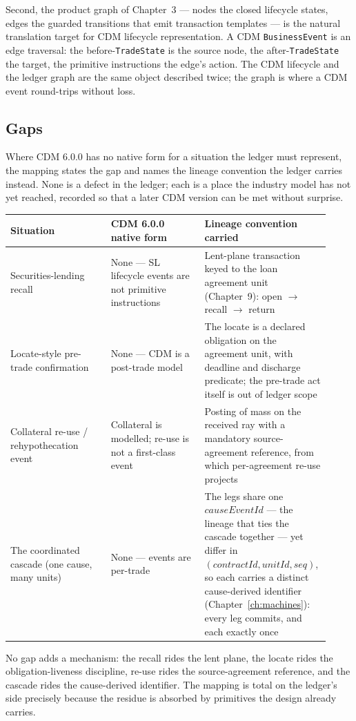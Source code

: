 Second, the product graph of Chapter~3 --- nodes the closed lifecycle states,
edges the guarded transitions that emit transaction templates --- is the natural
translation target for CDM lifecycle representation. A CDM \texttt{BusinessEvent}
is an edge traversal: the before-\texttt{TradeState} is the source node, the
after-\texttt{TradeState} the target, the primitive instructions the edge's
action. The CDM lifecycle and the ledger graph are the same object described
twice; the graph is where a CDM event round-trips without loss.

\subsection{Gaps}

Where CDM 6.0.0 has no native form for a situation the ledger must represent,
the mapping states the gap and names the lineage convention the ledger carries
instead. None is a defect in the ledger; each is a place the industry model has
not yet reached, recorded so that a later CDM version can be met without
surprise.

\begin{center}
\small
\begin{tabular}{@{}p{0.30\linewidth}p{0.28\linewidth}p{0.34\linewidth}@{}}
\toprule
\textbf{Situation} & \textbf{CDM 6.0.0 native form} & \textbf{Lineage convention carried} \\
\midrule
Securities-lending recall & None --- SL lifecycle events are not primitive
  instructions & Lent-plane transaction keyed to the loan agreement unit
  (Chapter~9): open $\to$ recall $\to$ return \\
Locate-style pre-trade confirmation & None --- CDM is a post-trade model & The
  locate is a declared obligation on the agreement unit, with deadline and
  discharge predicate; the pre-trade act itself is out of ledger scope \\
Collateral re-use / rehypothecation event & Collateral is modelled; re-use is
  not a first-class event & Posting of mass on the received ray with a
  mandatory source-agreement reference, from which per-agreement re-use projects \\
The coordinated cascade (one cause, many units) & None --- events are
  per-trade & The legs share one $\mathit{causeEventId}$ --- the lineage that ties
  the cascade together --- yet differ in $(\mathit{contractId},\mathit{unitId},\mathit{seq})$,
  so each carries a distinct cause-derived identifier (Chapter~\ref{ch:machines}):
  every leg commits, and each exactly once \\
\bottomrule
\end{tabular}
\end{center}

No gap adds a mechanism: the recall rides the lent plane, the locate rides the
obligation-liveness discipline, re-use rides the source-agreement reference, and
the cascade rides the cause-derived identifier. The mapping is total on the
ledger's side precisely because the residue is absorbed by primitives the design
already carries.

